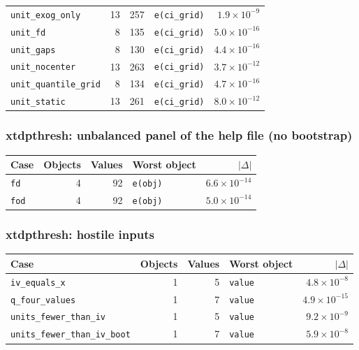 \begin{longtable}{@{}p{3.6cm}rrp{4.9cm}r@{}}
\texttt{unit\_\allowbreak{}exog\_\allowbreak{}only} & 13 & 257 & \texttt{e(ci\_\allowbreak{}grid)} & $1.9\times10^{-9}$ \\
\texttt{unit\_\allowbreak{}fd} & 8 & 135 & \texttt{e(ci\_\allowbreak{}grid)} & $5.0\times10^{-16}$ \\
\texttt{unit\_\allowbreak{}gaps} & 8 & 130 & \texttt{e(ci\_\allowbreak{}grid)} & $4.4\times10^{-16}$ \\
\texttt{unit\_\allowbreak{}nocenter} & 13 & 263 & \texttt{e(ci\_\allowbreak{}grid)} & $3.7\times10^{-12}$ \\
\texttt{unit\_\allowbreak{}quantile\_\allowbreak{}grid} & 8 & 134 & \texttt{e(ci\_\allowbreak{}grid)} & $4.7\times10^{-16}$ \\
\texttt{unit\_\allowbreak{}static} & 13 & 261 & \texttt{e(ci\_\allowbreak{}grid)} & $8.0\times10^{-12}$ \\
\bottomrule
\end{longtable}

\subsubsection*{xtdpthresh: unbalanced panel of the help file (no bootstrap)}

\begin{longtable}{@{}p{3.6cm}rrp{4.9cm}r@{}}
\toprule
Case & Objects & Values & Worst object & $|\Delta|$ \\
\midrule
\endhead
\texttt{fd} & 4 & 92 & \texttt{e(obj)} & $6.6\times10^{-14}$ \\
\texttt{fod} & 4 & 92 & \texttt{e(obj)} & $5.0\times10^{-14}$ \\
\bottomrule
\end{longtable}

\subsubsection*{xtdpthresh: hostile inputs}

\begin{longtable}{@{}p{3.6cm}rrp{4.9cm}r@{}}
\toprule
Case & Objects & Values & Worst object & $|\Delta|$ \\
\midrule
\endhead
\texttt{iv\_\allowbreak{}equals\_\allowbreak{}x} & 1 & 5 & \texttt{value} & $4.8\times10^{-8}$ \\
\texttt{q\_\allowbreak{}four\_\allowbreak{}values} & 1 & 7 & \texttt{value} & $4.9\times10^{-15}$ \\
\texttt{units\_\allowbreak{}fewer\_\allowbreak{}than\_\allowbreak{}iv} & 1 & 5 & \texttt{value} & $9.2\times10^{-9}$ \\
\texttt{units\_\allowbreak{}fewer\_\allowbreak{}than\_\allowbreak{}iv\_\allowbreak{}boot} & 1 & 7 & \texttt{value} & $5.9\times10^{-8}$ \\
\bottomrule
\end{longtable}


